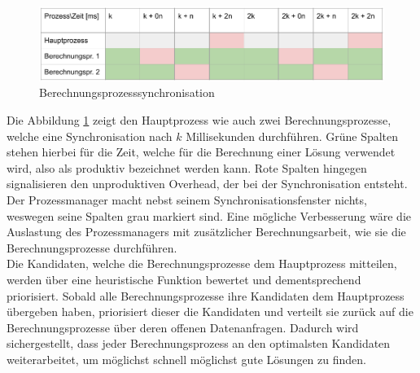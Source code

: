 \begin{figure}[h!]
    \begin{center}
        \includegraphics[width=0.8\linewidth]{../common/03_billiard_ai/resources/15_berechnungsprozess_synchronisation.png}
    \end{center}
    \caption{Berechnungsprozesssynchronisation}
    \label{fig:berechnungsprozess_synchronisation}
\end{figure}

Die Abbildung \ref{fig:berechnungsprozess_synchronisation} zeigt den Hauptprozess wie auch zwei Berechnungsprozesse, welche
eine Synchronisation nach $k$ Millisekunden durchführen. Grüne Spalten stehen hierbei für die Zeit, welche für die Berechnung
einer Lösung verwendet wird, also als produktiv bezeichnet werden kann. Rote Spalten hingegen signalisieren den unproduktiven
Overhead, der bei der Synchronisation entsteht. Der Prozessmanager macht nebst seinem Synchronisationsfenster nichts,
weswegen seine Spalten grau markiert sind. Eine mögliche Verbesserung wäre die Auslastung des Prozessmanagers mit zusätzlicher
Berechnungsarbeit, wie sie die Berechnungsprozesse durchführen.
\\

Die Kandidaten, welche die Berechnungsprozesse dem Hauptprozess mitteilen, werden über eine heuristische Funktion bewertet
und dementsprechend priorisiert. Sobald alle Berechnungsprozesse ihre Kandidaten dem Hauptprozess übergeben haben,
priorisiert dieser die Kandidaten und verteilt sie zurück auf die Berechnungsprozesse über deren offenen Datenanfragen.
Dadurch wird sichergestellt, dass jeder Berechnungsprozess an den optimalsten Kandidaten weiterarbeitet, um möglichst
schnell möglichst gute Lösungen zu finden.